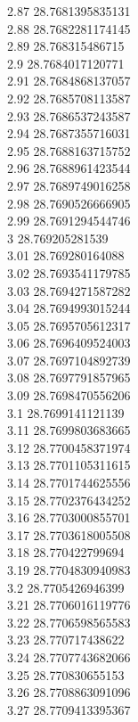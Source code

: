 {2.87	28.7681395835131\\
2.88	28.7682281174145\\
2.89	28.768315486715\\
2.9	28.7684017120771\\
2.91	28.7684868137057\\
2.92	28.7685708113587\\
2.93	28.7686537243587\\
2.94	28.7687355716031\\
2.95	28.7688163715752\\
2.96	28.7688961423544\\
2.97	28.7689749016258\\
2.98	28.7690526666905\\
2.99	28.7691294544746\\
3	28.769205281539\\
3.01	28.769280164088\\
3.02	28.7693541179785\\
3.03	28.7694271587282\\
3.04	28.7694993015244\\
3.05	28.7695705612317\\
3.06	28.7696409524003\\
3.07	28.7697104892739\\
3.08	28.7697791857965\\
3.09	28.7698470556206\\
3.1	28.7699141121139\\
3.11	28.7699803683665\\
3.12	28.7700458371974\\
3.13	28.7701105311615\\
3.14	28.7701744625556\\
3.15	28.7702376434252\\
3.16	28.7703000855701\\
3.17	28.7703618005508\\
3.18	28.770422799694\\
3.19	28.7704830940983\\
3.2	28.7705426946399\\
3.21	28.7706016119776\\
3.22	28.7706598565583\\
3.23	28.770717438622\\
3.24	28.7707743682066\\
3.25	28.770830655153\\
3.26	28.7708863091096\\
3.27	28.7709413395367\\
}
